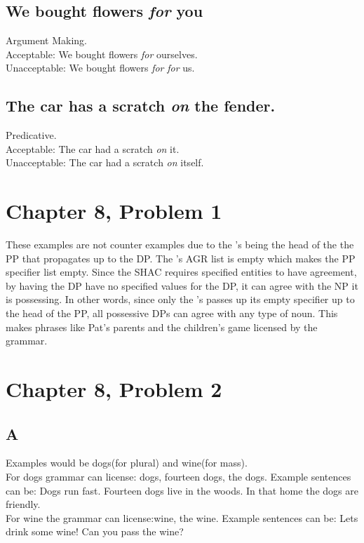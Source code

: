 \documentclass{article}
\begin{document}
\subsection{We bought flowers {\it for} you}
Argument Making.\\
Acceptable: We bought flowers {\it for} ourselves.\\
Unacceptable: We bought flowers {\it for} {\it for} us.\\
\subsection{The car has a scratch {\it on} the fender.}
Predicative. \\
Acceptable: The car had a scratch {\it on} it. \\
Unacceptable:  The car had a scratch {\it on} itself.
\section{Chapter 8, Problem 1}
These examples are not counter examples due to the 's being the head of the the PP that propagates up to the DP. The 's AGR list is empty which makes the PP specifier list empty. Since the SHAC requires specified entities to have agreement, by having the DP have no specified values for the DP, it can agree with the NP it is possessing. In other words, since only the 's passes up its empty specifier up to the head of the PP, all possessive DPs can agree with any type of noun. This makes phrases like Pat's parents and the children's game licensed by the grammar.
\section{Chapter 8, Problem 2}
\subsection{A}
Examples would be dogs(for plural) and wine(for mass). \\ For dogs grammar can license: dogs, fourteen dogs, the dogs. Example sentences can be: Dogs run fast. Fourteen dogs live in the woods. In that home the dogs are friendly. \\ 
For wine the grammar can license:wine, the wine.
Example sentences can be: Lets drink some wine! Can you pass the wine?
\end{document}
